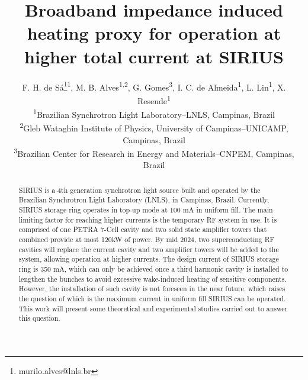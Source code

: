 \documentclass[a4paper,
               biblatex,     %
               ]{jacow}
\begin{document}
\title{Broadband impedance induced heating proxy for operation at higher total current at SIRIUS}

\author{
    F. H. de Sá\thanks{murilo.alves@lnls.br}\textsuperscript{1},
    M. B. Alves\textsuperscript{1,2},
    G. Gomes\textsuperscript{3},
    I. C. de Almeida\textsuperscript{1},
    L. Lin\textsuperscript{1},
    X. Resende\textsuperscript{1}\\
    \textsuperscript{1}Brazilian Synchrotron Light Laboratory--LNLS, Campinas, Brazil\\
    \textsuperscript{2}Gleb Wataghin Institute of Physics, University of Campinas--UNICAMP, Campinas, Brazil\\
    \textsuperscript{3}Brazilian Center for Research in Energy and Materials--CNPEM, Campinas, Brazil
}

\maketitle

\begin{abstract}
    SIRIUS is a 4th generation synchrotron light source built and operated by the Brazilian Synchrotron Light Laboratory (LNLS), in Campinas, Brazil. Currently, SIRIUS storage ring operates in top-up mode at 100 mA in uniform fill. The main limiting factor for reaching higher currents is the temporary RF system in use. It is comprised of one PETRA 7-Cell cavity and two solid state amplifier towers that combined provide at most 120kW of power. By mid 2024, two superconducting RF cavities will replace the current cavity and two amplifier towers will be added to the system, allowing operation at higher currents. The design current of SIRIUS storage ring is 350 mA, which can only be achieved once a third harmonic cavity is installed to lengthen the bunches to avoid excessive wake-induced heating of sensitive components. However, the installation of such cavity is not foreseen in the near future, which raises the question of which is the maximum current in uniform fill SIRIUS can be operated. This work will present some theoretical and experimental studies carried out to answer this question.
\end{abstract} 
\end{document}

